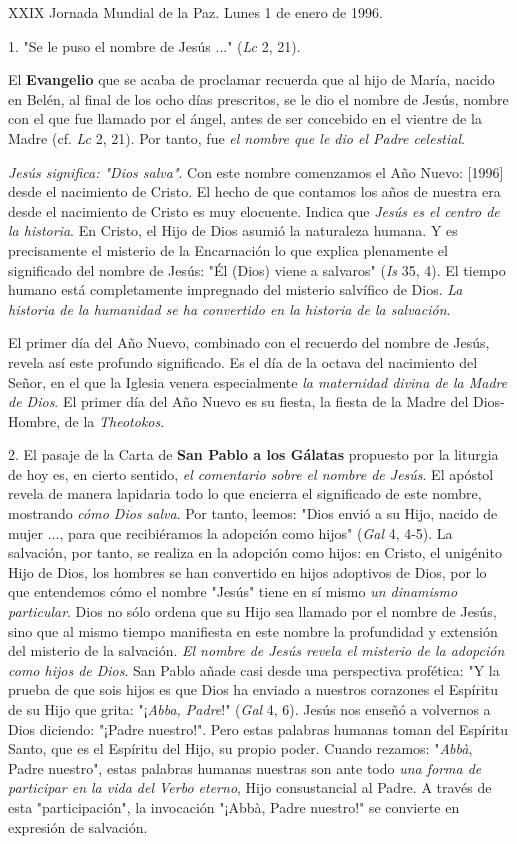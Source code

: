 \begin{body}
XXIX Jornada Mundial de la Paz. Lunes 1 de enero de 1996.

1. "Se le puso el nombre de Jesús ..." (\emph{Lc} 2, 21).

El \textbf{Evangelio} que se acaba de proclamar recuerda que al hijo de María, nacido en Belén, al final de los ocho días prescritos, se le dio el nombre de Jesús, nombre con el que fue llamado por el ángel, antes de ser concebido en el vientre de la Madre (cf. \emph{Lc} 2, 21). Por tanto, fue \emph{el nombre que le dio el Padre celestial}.

\emph{Jesús significa: "Dios salva"}. Con este nombre comenzamos el Año Nuevo: {[}1996{]} desde el nacimiento de Cristo. El hecho de que contamos los años de nuestra era desde el nacimiento de Cristo es muy elocuente. Indica que \emph{Jesús es el centro de la historia}. En Cristo, el Hijo de Dios asumió la naturaleza humana. Y es precisamente el misterio de la Encarnación lo que explica plenamente el significado del nombre de Jesús: "Él (Dios) viene a salvaros" (\emph{Is} 35, 4). El tiempo humano está completamente impregnado del misterio salvífico de Dios. \emph{La historia de la humanidad se ha convertido en la historia de la salvación}.

El primer día del Año Nuevo, combinado con el recuerdo del nombre de Jesús, revela así este profundo significado. Es el día de la octava del nacimiento del Señor, en el que la Iglesia venera especialmente \emph{la maternidad divina de la Madre de Dios}. El primer día del Año Nuevo es su fiesta, la fiesta de la Madre del Dios-Hombre, de la \emph{Theotokos}.

2. El pasaje de la Carta de \textbf{San Pablo a los Gálatas} propuesto por la liturgia de hoy es, en cierto sentido, \emph{el comentario sobre el nombre de Jesús}. El apóstol revela de manera lapidaria todo lo que encierra el significado de este nombre, mostrando \emph{cómo Dios salva}. Por tanto, leemos: "Dios envió a su Hijo, nacido de mujer ..., para que recibiéramos la adopción como hijos" (\emph{Gal} 4, 4-5). La salvación, por tanto, se realiza en la adopción como hijos: en Cristo, el unigénito Hijo de Dios, los hombres se han convertido en hijos adoptivos de Dios, por lo que entendemos cómo el nombre "Jesús" tiene en sí mismo \emph{un dinamismo particular}. Dios no sólo ordena que su Hijo sea llamado por el nombre de Jesús, sino que al mismo tiempo manifiesta en este nombre la profundidad y extensión del misterio de la salvación. \emph{El nombre de Jesús revela el misterio de la adopción como hijos de Dios}. San Pablo añade casi desde una perspectiva profética: "Y la prueba de que sois hijos es que Dios ha enviado a nuestros corazones el Espíritu de su Hijo que grita: "¡\emph{Abba, Padre}!" (\emph{Gal} 4, 6). Jesús nos enseñó a volvernos a Dios diciendo: "¡Padre nuestro!". Pero estas palabras humanas toman del Espíritu Santo, que es el Espíritu del Hijo, su propio poder. Cuando rezamos: "\emph{Abbà}, Padre nuestro", estas palabras humanas nuestras son ante todo \emph{una forma de participar en la vida del Verbo eterno}, Hijo consustancial al Padre. A través de esta "participación", la invocación "¡Abbà, Padre nuestro!" se convierte en expresión de salvación.


\end{body}
